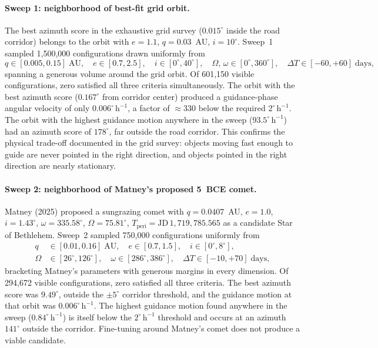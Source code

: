 \documentclass[11pt,a4paper]{article}
\begin{document}
\paragraph{Sweep 1: neighborhood of best-fit grid orbit.}
The best azimuth score in the exhaustive grid survey ($0.015^\circ$
inside the road corridor) belongs to the orbit with $e=1.1$,
$q=0.03$~AU, $i=10^\circ$.
Sweep~1 sampled 1,500,000 configurations drawn uniformly from
\[
  q \in [0.005, 0.15]\;\text{AU},\quad
  e \in [0.7, 2.5],\quad
  i \in [0^\circ, 40^\circ],\quad
  \Omega,\,\omega \in [0^\circ, 360^\circ],\quad
  \Delta T \in [-60, +60]\;\text{days},
\]
spanning a generous volume around the grid orbit.
Of 601,150 visible configurations, zero satisfied all three criteria
simultaneously.
The orbit with the best azimuth score ($0.167^\circ$ from corridor
center) produced a guidance-phase angular velocity of only
$0.006^\circ\,\mathrm{h}^{-1}$, a factor of ${\approx}330$ below the
required $2^\circ\,\mathrm{h}^{-1}$.
The orbit with the highest guidance motion anywhere in the sweep
($93.5^\circ\,\mathrm{h}^{-1}$) had an azimuth score of
$178^\circ$, far outside the road corridor.
This confirms the physical trade-off documented in the grid survey:
objects moving fast enough to guide are never pointed in the right
direction, and objects pointed in the right direction are nearly
stationary.

\paragraph{Sweep 2: neighborhood of Matney's proposed 5~BCE comet.}
Matney (2025)\nocite{matney2025jbaa} proposed a sungrazing comet with
$q=0.0407$~AU, $e=1.0$, $i=1.43^\circ$, $\omega=335.58^\circ$,
$\Omega=75.81^\circ$, $T_\text{peri}=\text{JD}\,1{,}719{,}785.565$
as a candidate Star of Bethlehem.
Sweep~2 sampled 750,000 configurations uniformly from
\[
  \begin{aligned}
    q &\in [0.01, 0.16]\;\text{AU},\quad
    e \in [0.7, 1.5],\quad
    i \in [0^\circ, 8^\circ],\quad \\
    \Omega &\in [26^\circ, 126^\circ],\quad
    \omega \in [286^\circ, 386^\circ],\quad
    \Delta T \in [-10, +70]\;\text{days},
  \end{aligned}
\]
bracketing Matney's parameters with generous margins in every dimension.
Of 294,672 visible configurations, zero satisfied all three criteria.
The best azimuth score was $9.49^\circ$, outside the $\pm5^\circ$
corridor threshold, and the guidance motion at that orbit was
$0.006^\circ\,\mathrm{h}^{-1}$.
The highest guidance motion found anywhere in the sweep ($0.84^\circ\,\mathrm{h}^{-1}$)
is itself below the $2^\circ\,\mathrm{h}^{-1}$ threshold and occurs at an
azimuth $141^\circ$ outside the corridor.
Fine-tuning around Matney's comet does not produce a viable candidate.
\end{document}
